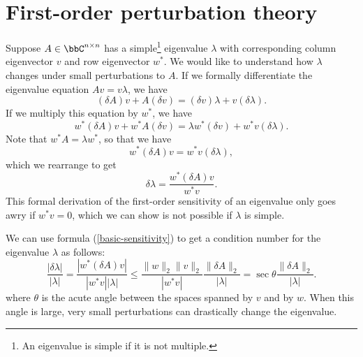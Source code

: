 \section{First-order perturbation theory}

Suppose $A \in \bbC^{n \times n}$ has a simple\footnote{
  An eigenvalue is simple if it is not multiple.
} eigenvalue $\lambda$ with corresponding column
eigenvector $v$ and row eigenvector $w^*$.
We would like to understand how $\lambda$ changes under
small perturbations to $A$.  If we formally differentiate
the eigenvalue equation $A v = v \lambda$, we have
\[
  (\delta A) v + A (\delta v) = (\delta v) \lambda + v (\delta \lambda).
\]
If we multiply this equation by $w^*$, we have
\[
  w^* (\delta A) v + w^* A (\delta v) =
  \lambda w^* (\delta v) + w^* v (\delta \lambda).
\]
Note that $w^* A = \lambda w^*$, so that we have
\[
  w^* (\delta A) v = w^* v (\delta \lambda),
\]
which we rearrange to get
\begin{equation} \label{basic-sensitivity}
  \delta \lambda = \frac{w^* (\delta A) v}{w^* v}.
\end{equation}
This formal derivation of the first-order sensitivity of an
eigenvalue only goes awry if $w^* v = 0$, which we can show is
not possible if $\lambda$ is simple.

We can use formula (\ref{basic-sensitivity}) to get a condition
number for the eigenvalue $\lambda$ as follows:
\[
  \frac{|\delta \lambda|}{|\lambda|}
   = \frac{|w^* (\delta A) v|}{|w^* v| |\lambda|}
    \leq \frac{\|w\|_2 \|v\|_2}{|w^* v|} \frac{\|\delta A\|_2}{|\lambda|}
    = \sec \theta \frac{\|\delta A\|_2}{|\lambda|}.
\]
where $\theta$ is the acute angle between the spaces spanned by $v$ and by $w$.
When this angle is large, very small perturbations can drastically change the
eigenvalue.

